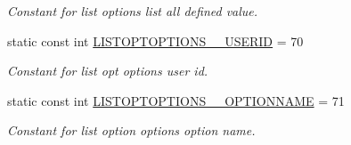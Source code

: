 \begin{DoxyCompactItemize}
\begin{DoxyCompactList}\small\item\em Constant for list options list all defined value. \item\end{DoxyCompactList}\item 
\hypertarget{classUMS__Data_1_1UMS__DataPackage_a1db822d1b2beace3b919372744d93231}{
static const int \hyperlink{classUMS__Data_1_1UMS__DataPackage_a1db822d1b2beace3b919372744d93231}{LISTOPTOPTIONS\_\-\_\-USERID} = 70}
\label{classUMS__Data_1_1UMS__DataPackage_a1db822d1b2beace3b919372744d93231}

\begin{DoxyCompactList}\small\item\em Constant for list opt options user id. \item\end{DoxyCompactList}\item 
\hypertarget{classUMS__Data_1_1UMS__DataPackage_a81bac63634637b26649349f14a633ada}{
static const int \hyperlink{classUMS__Data_1_1UMS__DataPackage_a81bac63634637b26649349f14a633ada}{LISTOPTOPTIONS\_\-\_\-OPTIONNAME} = 71}
\label{classUMS__Data_1_1UMS__DataPackage_a81bac63634637b26649349f14a633ada}

\begin{DoxyCompactList}\small\item\em Constant for list option options option name. \item\end{DoxyCompactList}\end{DoxyCompactItemize}
